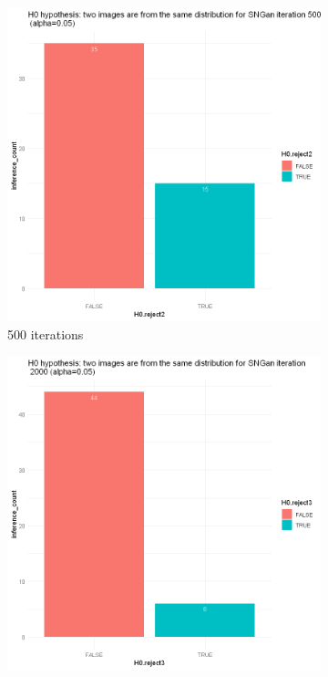 \documentclass{article}
\begin{document}
\begin{figure}[h!]
    \caption{Dataset Anime}
     \centering
     \begin{subfigure}[b]{0.3\textwidth}
         \centering
         \includegraphics[width=\textwidth]{kmmd_figures/sngan_anime_500.png}
         \caption{500 iterations}
     \end{subfigure}
     \hfill
     \begin{subfigure}[b]{0.3\textwidth}
         \centering
         \includegraphics[width=\textwidth]{kmmd_figures/sngan_anime_2000.png}

\end{subfigure}
\end{figure}
\end{document}
